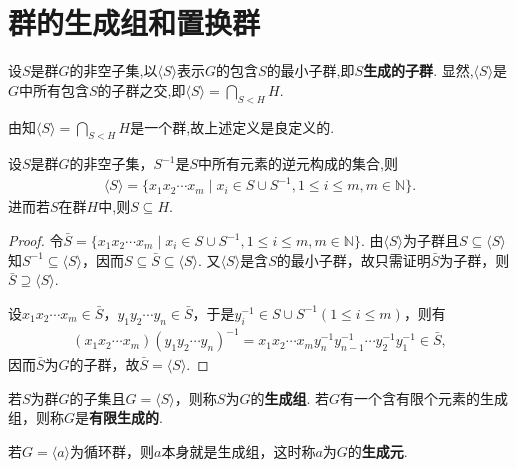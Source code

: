 \documentclass[../../main.tex]{subfiles}%
\begin{document}
\section{群的生成组和置换群}

\begin{definition}
设$S$是群$G$的非空子集,以$\langle S\rangle$表示$G$的包含$S$的最小子群,即$S$\textbf{生成的子群}.
显然,$\langle S\rangle$是$G$中所有包含$S$的子群之交,即$\langle S\rangle=\bigcap_{S<H}{H}.$
\end{definition}
\begin{note}
由知$\langle S\rangle=\bigcap_{S<H}{H}$是一个群,故上述定义是良定义的.
\end{note}

\begin{theorem}\label{theorem:生成子群的元素的形式}
设$S$是群$G$的非空子集，$S^{-1}$是$S$中所有元素的逆元构成的集合,则
\begin{align*}
\langle S\rangle = \{x_1x_2\cdots x_m \mid x_i \in S \cup S^{-1}, 1 \leqslant i \leqslant m, m \in \mathbb{N}\}.
\end{align*}
进而若$S$在群$H$中,则$S\subseteq H$.
\end{theorem}
\begin{proof}
令$\bar{S} = \{x_1x_2\cdots x_m \mid x_i \in S \cup S^{-1}, 1 \leqslant i \leqslant m, m \in \mathbb{N}\}$. 由$\langle S\rangle$为子群且$S \subseteq \langle S\rangle$知$S^{-1} \subseteq \langle S\rangle$，因而$S \subseteq \bar{S} \subseteq \langle S\rangle$. 又$\langle S\rangle$是含$S$的最小子群，故只需证明$\bar{S}$为子群，则$\bar{S} \supseteq \langle S\rangle$.

设$x_1x_2\cdots x_m \in \bar{S}$，$y_1y_2\cdots y_n \in \bar{S}$，于是$y_i^{-1} \in S \cup S^{-1}(1 \leqslant i \leqslant m)$，则有
\begin{align*}
(x_1x_2\cdots x_m)(y_1y_2\cdots y_n)^{-1} = x_1x_2\cdots x_m y_n^{-1} y_{n-1}^{-1} \cdots y_2^{-1} y_1^{-1} \in \bar{S},
\end{align*}
因而$\bar{S}$为$G$的子群，故$\bar{S} = \langle S\rangle$.
\end{proof}

\begin{definition}
若$S$为群$G$的子集且$G = \langle S\rangle$，则称$S$为$G$的\textbf{生成组}. 若$G$有一个含有限个元素的生成组，则称$G$是\textbf{有限生成的}.

若$G = \langle a\rangle$为循环群，则$a$本身就是生成组，这时称$a$为$G$的\textbf{生成元}.
\end{definition}
\end{document}
